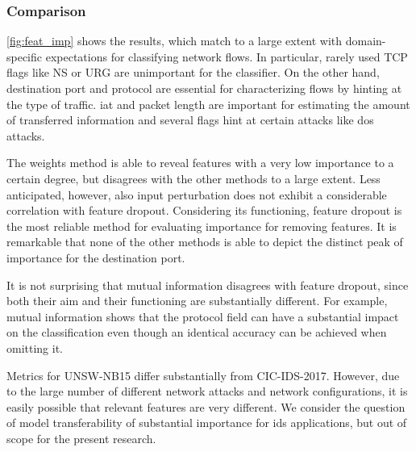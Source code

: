 \documentclass[conference]{IEEEtran}
\begin{document}
\subsubsection{Comparison}
\autoref{fig:feat_imp} shows the results, which match to a large extent with domain-specific expectations for classifying network flows.
In particular, rarely used TCP flags like NS or URG are unimportant for the classifier. On the other hand, destination port and protocol are essential for characterizing flows by hinting at the type of traffic. \gls{iat} and packet length are important for estimating the amount of transferred information and several flags hint at certain attacks like \gls{dos} attacks.

The weights method is able to reveal features with a very low importance to a certain degree, but disagrees with the other methods to a large extent. Less anticipated, however, also input perturbation does not exhibit a considerable correlation with feature dropout. Considering its functioning, feature dropout is the most reliable method for evaluating importance for removing features. It is remarkable that none of the other methods is able to depict the distinct peak of importance for the destination port.

It is not surprising that mutual information disagrees with feature dropout, since both their aim and their functioning are substantially different. For example, mutual information shows that the protocol field can have a substantial impact on the classification even though an identical accuracy can be achieved when omitting it.


Metrics for UNSW-NB15 differ substantially from CIC-IDS-2017. However, due to the large number of different network attacks and network configurations, it is easily possible that relevant features are very different. We consider the question of model transferability of substantial importance for \gls{ids} applications, but out of scope for the present research.
\end{document}
